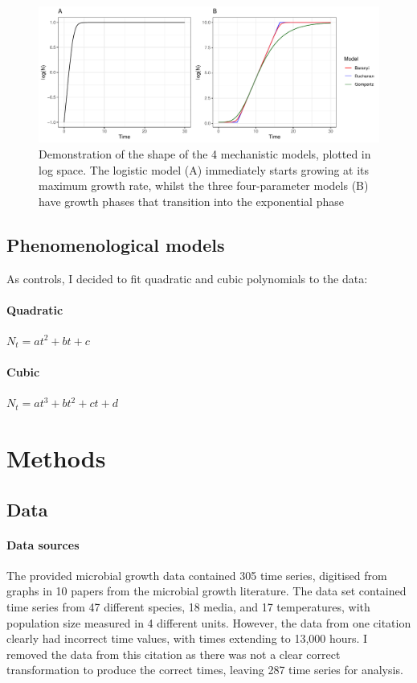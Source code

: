 \documentclass[11pt, a4paper]{article}
\begin{document}
\begin{linenumbers}
        \begin{figure}[h]
        \includegraphics[width=\linewidth]{../results/model_demo.pdf}
        \captionsetup{format=hang}
        \caption{Demonstration of the shape of the 4 mechanistic models, plotted in log space. The logistic model (A) immediately starts growing at its maximum growth rate, whilst the three four-parameter models (B) have growth phases that transition into the exponential phase}
        \label{fig:models_demo}
        \end{figure}

\subsection{Phenomenological models}
As controls, I decided to fit quadratic and cubic polynomials to the data:
\paragraph*{Quadratic} $ N_t = at^2 + bt + c $
\paragraph{Cubic} \quad \quad $ N_t = at^3 + bt^2 + ct + d $


   \section{Methods}
   
   \subsection{Data}
   
\paragraph{Data sources}
The provided microbial growth data contained 305 time series, digitised from graphs in 10 papers from the microbial growth literature. The data set contained time series from 47 different species, 18 media, and 17 temperatures, with population size measured in 4 different units. However, the data from one citation \cite{discarded} clearly had incorrect time values, with times extending to 13,000 hours. I removed the data from this citation as there was not a clear correct transformation to produce the correct times, leaving 287 time series for analysis.


\end{linenumbers}
\end{document}
